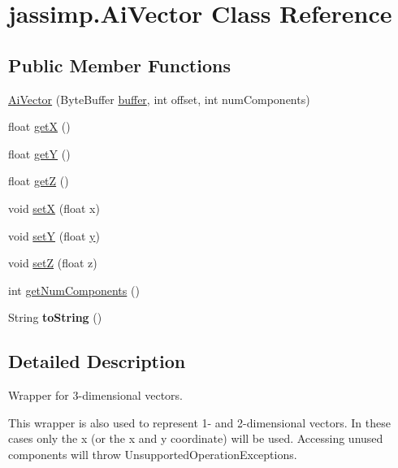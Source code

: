 \hypertarget{classjassimp_1_1_ai_vector}{\section{jassimp.\+Ai\+Vector Class Reference}
\label{classjassimp_1_1_ai_vector}
}
\subsection*{Public Member Functions}
\begin{DoxyCompactItemize}
\item 
\hyperlink{classjassimp_1_1_ai_vector_a240e2c577f034107a0d1b21176289cc0}{Ai\+Vector} (Byte\+Buffer \hyperlink{structbuffer}{buffer}, int offset, int num\+Components)
\item 
float \hyperlink{classjassimp_1_1_ai_vector_ae91943415cf4389263669a742738b667}{get\+X} ()
\item 
float \hyperlink{classjassimp_1_1_ai_vector_a1e3b13d0fccb4811903bd99ce79f6670}{get\+Y} ()
\item 
float \hyperlink{classjassimp_1_1_ai_vector_aee1634bfc67a9bf351a158a4e303c879}{get\+Z} ()
\item 
void \hyperlink{classjassimp_1_1_ai_vector_a793d21d918f726a23a06d0dbf4ec9826}{set\+X} (float x)
\item 
void \hyperlink{classjassimp_1_1_ai_vector_a3c9fa6155224c427e1c5d43494732403}{set\+Y} (float \hyperlink{_ice_utils_8h_aa7ffaed69623192258fb8679569ff9ba}{y})
\item 
void \hyperlink{classjassimp_1_1_ai_vector_a85e7d2592ff972d4df5b08ab25d1ea58}{set\+Z} (float z)
\item 
int \hyperlink{classjassimp_1_1_ai_vector_a453b90620a7b44efd3fcd8a4c183fcbb}{get\+Num\+Components} ()
\item 
\hypertarget{classjassimp_1_1_ai_vector_a065f2c9c9037c75a29c7451a5a63e55b}{String {\bfseries to\+String} ()}\label{classjassimp_1_1_ai_vector_a065f2c9c9037c75a29c7451a5a63e55b}

\end{DoxyCompactItemize}


\subsection{Detailed Description}
Wrapper for 3-\/dimensional vectors.

This wrapper is also used to represent 1-\/ and 2-\/dimensional vectors. In these cases only the x (or the x and y coordinate) will be used. Accessing unused components will throw Unsupported\+Operation\+Exceptions.

